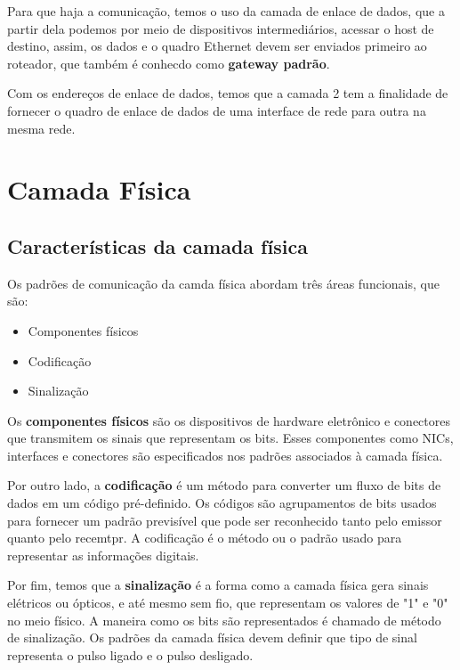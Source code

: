 \documentclass[12pt a4paper]{paper}
\begin{document}
Para que haja a comunicação, temos o uso da camada de enlace de dados, que a partir 
dela podemos por meio de dispositivos intermediários, acessar o host de destino,
assim, os dados e o quadro Ethernet devem ser enviados primeiro ao roteador, que também 
é conhecdo como \textbf{gateway padrão}. 

Com os endereços de enlace de dados, temos que a camada 2 tem a finalidade de fornecer 
o quadro de enlace de dados de uma interface de rede para outra na mesma rede.


\section{Camada Física} %
\label{sec:Camada Física}
\subsection{Características da camada física} %
\label{sub:Características da camada física}
Os padrões de comunicação da camda física abordam três áreas funcionais, que são: 

\begin{itemize}
  \item Componentes físicos
  \item Codificação 
  \item Sinalização
\end{itemize}

Os \textbf{componentes físicos} são os dispositivos de hardware eletrônico e conectores 
que transmitem os sinais que representam os bits. Esses componentes como NICs, interfaces e conectores são especificados nos padrões associados à camada física.

Por outro lado, a \textbf{codificação} é um método para converter um fluxo de bits 
de dados em um código pré-definido. Os códigos são agrupamentos de bits usados para 
fornecer um padrão previsível que pode ser reconhecido tanto pelo emissor quanto pelo 
recemtpr. A codificação é o método ou o padrão usado para representar as informações 
digitais. 

Por fim, temos que a \textbf{sinalização} é a forma como a camada física gera sinais 
elétricos ou ópticos, e até mesmo sem fio, que representam os valores de "1" e "0" no 
meio físico. A maneira como os bits são representados é chamado de método de 
sinalização. Os padrões da camada física devem definir que tipo de sinal representa 
o pulso ligado e o pulso desligado.
\end{document}
